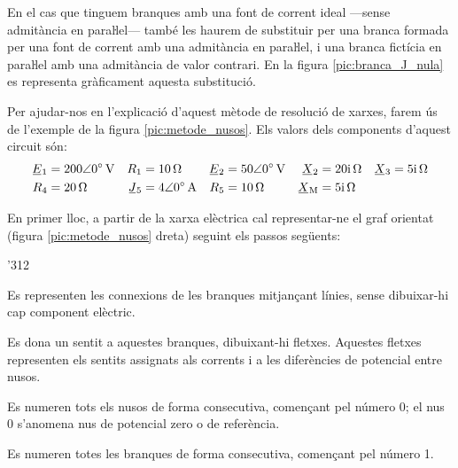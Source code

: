 En el cas que tinguem branques amb una font de corrent ideal ---sense admitància en paraŀlel---  també les haurem de substituir per una branca  formada per una font de corrent amb una admitància en paraŀlel, i una branca fictícia en paraŀlel amb una admitància de valor contrari. En la figura \vref{pic:branca_J_nula} es representa gràficament aquesta substitució.
\begin{center}
	
	\label{pic:branca_J_nula}
\end{center}

Per ajudar-nos en l'explicació d'aquest mètode de resolució de xarxes, farem
ús de l'exemple de la figura \vref{pic:metode_nusos}. Els valors dels components d'aquest
circuit són:
\begin{align*}
   \cmplx{E}_1 &= \complexqty{200:0}{V} & R_1 &= \qty{10}{\ohm} &
   \cmplx{E}_2 &= \complexqty{50:0}{V}  & \cmplx{X}_2 &= \complexqty{j20}{\ohm} &
   \cmplx{X}_3 &= \complexqty{j5}{\ohm} \\
   R_4 &= \qty{20}{\ohm} & \cmplx{J}_5 &= \complexqty{4:0}{A} &
   R_5 &= \qty{10}{\ohm} & \cmplx{X}\ped{M} &= \complexqty{j5}{\ohm}
\end{align*}

\begin{center}
\vspace{-4mm}
    
    \label{pic:metode_nusos}
\end{center}

En primer lloc, a partir de la xarxa elèctrica
cal representar-ne el graf orientat (figura \vref{pic:metode_nusos} dreta) seguint els passos següents:
\begin{dingautolist}{'312}
   \item Es representen les connexions de les branques mitjançant línies, sense dibuixar-hi cap component elèctric.
   \item Es dona un sentit a aquestes branques, dibuixant-hi fletxes. Aquestes fletxes representen els sentits assignats als corrents i a les diferències de potencial entre nusos.
   \item Es numeren tots els nusos de forma consecutiva, començant pel número 0; el nus 0 s'anomena nus de potencial zero o de referència.
   \item Es numeren totes les branques de forma consecutiva, començant pel número 1.
\end{dingautolist}

